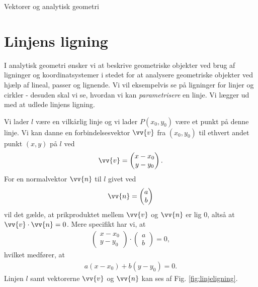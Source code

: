 \begin{center}
\Huge
Vektorer og analytisk geometri
\end{center}

\section*{Linjens ligning}

I analytisk geometri ønsker vi at beskrive geometriske objekter ved brug af ligninger og koordinatsystemer i stedet for at analysere geometriske objekter ved hjælp af lineal, passer og lignende. Vi vil eksempelvis se på ligninger for linjer og cirkler - desuden skal vi se, hvordan vi kan \textit{parametrisere} en linje. Vi lægger ud med at udlede linjens ligning.

Vi lader $l$ være en vilkårlig linje og vi lader $P(x_0,y_0)$ være et punkt på denne linje. Vi kan danne en forbindelsesvektor $\vv{v}$ fra $(x_0,y_0)$ til ethvert andet punkt $(x,y)$ på $l$ ved
\begin{align}\label{eq:eq1}
\vv{v} = \begin{pmatrix}
x-x_0\\y-y_0
\end{pmatrix}.
\end{align}
For en normalvektor $\vv{n}$ til $l$ givet ved
\begin{align*}
	\vv{n} = 
	\begin{pmatrix}
		a\\b
	\end{pmatrix}
\end{align*}
vil det gælde, at prikproduktet mellem $\vv{v}$ og $\vv{n}$ er lig 0, altså at $\vv{v}\cdot \vv{n} = 0$. Mere specifikt har vi, at 
\begin{align*}
	\begin{pmatrix}
		x-x_0\\ y-y_0
	\end{pmatrix} \cdot 
	\begin{pmatrix}
		a \\ b
	\end{pmatrix} = 0,
\end{align*}
hvilket medfører, at 
\begin{align*}
a(x-x_0) + b(y-y_0) = 0.
\end{align*}
Linjen $l$ samt vektorerne $\vv{v}$ og $\vv{n}$ kan ses af Fig. \ref{fig:linjeligning}.
